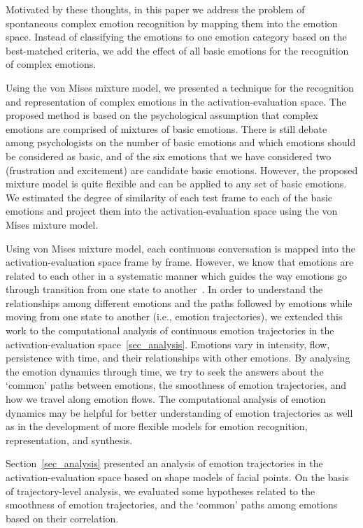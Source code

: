 \documentclass[10pt,journal,cspaper,compsoc]{IEEEtran}
\begin{document}
Motivated by these thoughts, in this paper we address the problem of spontaneous complex emotion recognition by mapping them into the emotion space. Instead of classifying the emotions to one emotion category based on the best-matched criteria, we add the effect of all basic emotions for the recognition of complex emotions. 

Using the von Mises mixture model, we presented a technique for the recognition and representation of complex emotions in the activation-evaluation space. The proposed method is based on the psychological assumption that complex emotions are comprised of mixtures of basic emotions. There is still debate among psychologists on the number of basic emotions and which emotions should be considered as basic, and of the six emotions that we have considered two (frustration and excitement) are candidate basic emotions. However, the proposed mixture model is quite flexible and can be applied to any set of basic emotions. We estimated the degree of similarity of each test frame to each of the basic emotions and project them into the activation-evaluation space using the von Mises mixture model.

Using von Mises mixture model, each continuous conversation is mapped into the activation-evaluation space frame by frame. However, we know that emotions are related to each other in a systematic manner which guides the way emotions go through transition from one state to another~\cite{blumberg1991patterns}. In order to understand the relationships among different emotions and the paths followed by emotions while moving from one state to another (i.e., emotion trajectories), we extended this work to the computational analysis of continuous emotion trajectories in the activation-evaluation space~\ref{sec_analysis}. Emotions vary in intensity, flow, persistence with time, and their relationships with other emotions. By analysing the emotion dynamics through time, we try to seek the answers about the `common' paths between emotions, the smoothness of emotion trajectories, and how we travel along emotion flows. The computational analysis of emotion dynamics may be helpful for better understanding of emotion trajectories as well as in the development of more flexible models for emotion recognition, representation, and synthesis.

Section~\ref{sec_analysis} presented an analysis of emotion trajectories in the activation-evaluation space based on shape models of facial points. On the basis of trajectory-level analysis, we evaluated some hypotheses related to the smoothness of emotion trajectories, and the `common' paths among emotions based on their correlation.
\end{document}
